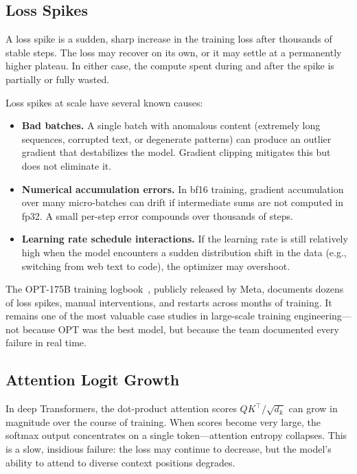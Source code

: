 \subsection{Loss Spikes}

A loss spike is a sudden, sharp increase in the training loss after thousands of stable steps. The loss may recover on its own, or it may settle at a permanently higher plateau. In either case, the compute spent during and after the spike is partially or fully wasted.

Loss spikes at scale have several known causes:

\begin{itemize}[nosep]
  \item \textbf{Bad batches.} A single batch with anomalous content (extremely long sequences, corrupted text, or degenerate patterns) can produce an outlier gradient that destabilizes the model. Gradient clipping mitigates this but does not eliminate it.
  \item \textbf{Numerical accumulation errors.} In bf16 training, gradient accumulation over many micro-batches can drift if intermediate sums are not computed in fp32. A small per-step error compounds over thousands of steps.
  \item \textbf{Learning rate schedule interactions.} If the learning rate is still relatively high when the model encounters a sudden distribution shift in the data (e.g., switching from web text to code), the optimizer may overshoot.
\end{itemize}

The OPT-175B training logbook~\cite{zhang2022opt}, publicly released by Meta, documents dozens of loss spikes, manual interventions, and restarts across months of training. It remains one of the most valuable case studies in large-scale training engineering---not because OPT was the best model, but because the team documented every failure in real time.

\subsection{Attention Logit Growth}

In deep Transformers, the dot-product attention scores $QK^\top / \sqrt{d_k}$ can grow in magnitude over the course of training. When scores become very large, the softmax output concentrates on a single token---attention entropy collapses. This is a slow, insidious failure: the loss may continue to decrease, but the model's ability to attend to diverse context positions degrades.

